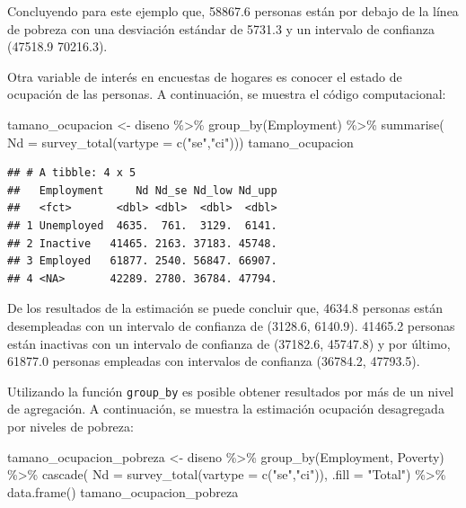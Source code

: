 \documentclass[
  12pt,
]{book}
\newenvironment{Shaded}{\begin{snugshade}}{\end{snugshade}}
\newcommand{\AttributeTok}[1]{\textcolor[rgb]{0.77,0.63,0.00}{#1}}
\newcommand{\FunctionTok}[1]{\textcolor[rgb]{0.00,0.00,0.00}{#1}}
\newcommand{\NormalTok}[1]{#1}
\newcommand{\OtherTok}[1]{\textcolor[rgb]{0.56,0.35,0.01}{#1}}
\newcommand{\SpecialCharTok}[1]{\textcolor[rgb]{0.00,0.00,0.00}{#1}}
\newcommand{\StringTok}[1]{\textcolor[rgb]{0.31,0.60,0.02}{#1}}
\begin{document}
Concluyendo para este ejemplo que, 58867.6 personas están por debajo de la línea de pobreza con una desviación estándar de 5731.3 y un intervalo de confianza (47518.9 70216.3).

Otra variable de interés en encuestas de hogares es conocer el estado de ocupación de las personas. A continuación, se muestra el código computacional:

\begin{Shaded}
\begin{Highlighting}[]
\NormalTok{tamano\_ocupacion }\OtherTok{\textless{}{-}}\NormalTok{ diseno }\SpecialCharTok{\%\textgreater{}\%} 
                    \FunctionTok{group\_by}\NormalTok{(Employment) }\SpecialCharTok{\%\textgreater{}\%} 
                    \FunctionTok{summarise}\NormalTok{( }\AttributeTok{Nd =} \FunctionTok{survey\_total}\NormalTok{(}\AttributeTok{vartype =} \FunctionTok{c}\NormalTok{(}\StringTok{"se"}\NormalTok{,}\StringTok{"ci"}\NormalTok{)))}
\NormalTok{tamano\_ocupacion}
\end{Highlighting}
\end{Shaded}

\begin{verbatim}
## # A tibble: 4 x 5
##   Employment     Nd Nd_se Nd_low Nd_upp
##   <fct>       <dbl> <dbl>  <dbl>  <dbl>
## 1 Unemployed  4635.  761.  3129.  6141.
## 2 Inactive   41465. 2163. 37183. 45748.
## 3 Employed   61877. 2540. 56847. 66907.
## 4 <NA>       42289. 2780. 36784. 47794.
\end{verbatim}

De los resultados de la estimación se puede concluir que, 4634.8 personas están desempleadas con un intervalo de confianza de (3128.6, 6140.9). 41465.2 personas están inactivas con un intervalo de confianza de (37182.6, 45747.8) y por último, 61877.0 personas empleadas con intervalos de confianza (36784.2, 47793.5).

Utilizando la función \texttt{group\_by} es posible obtener resultados por más de un nivel de agregación. A continuación, se muestra la estimación ocupación desagregada por niveles de pobreza:

\begin{Shaded}
\begin{Highlighting}[]
\NormalTok{tamano\_ocupacion\_pobreza }\OtherTok{\textless{}{-}}\NormalTok{ diseno }\SpecialCharTok{\%\textgreater{}\%} 
                            \FunctionTok{group\_by}\NormalTok{(Employment, Poverty) }\SpecialCharTok{\%\textgreater{}\%} 
                            \FunctionTok{cascade}\NormalTok{( }\AttributeTok{Nd =} \FunctionTok{survey\_total}\NormalTok{(}\AttributeTok{vartype =}                                     \FunctionTok{c}\NormalTok{(}\StringTok{"se"}\NormalTok{,}\StringTok{"ci"}\NormalTok{)), }\AttributeTok{.fill =} \StringTok{"Total"}\NormalTok{) }\SpecialCharTok{\%\textgreater{}\%}
                            \FunctionTok{data.frame}\NormalTok{()}
\NormalTok{tamano\_ocupacion\_pobreza}
\end{Highlighting}
\end{Shaded}
\end{document}
